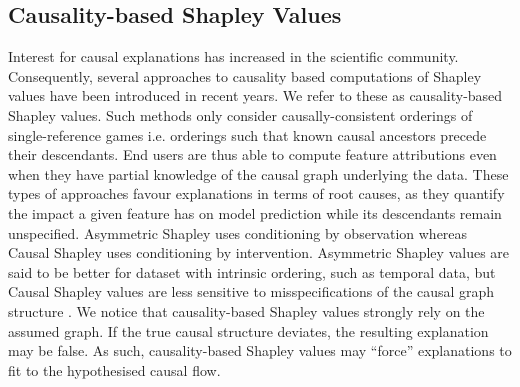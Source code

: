 \documentclass[nohyperref]{article}
\theoremstyle{plain}
\theoremstyle{definition}
\theoremstyle{remark}
\begin{document}
\subsection{Causality-based Shapley Values}
Interest for causal explanations has increased in the scientific community. Consequently, several approaches to causality based computations of Shapley values have been introduced in recent years. We refer to these as causality-based Shapley values. Such methods only consider causally-consistent orderings of single-reference games i.e. orderings such that known causal ancestors precede their descendants. End users are thus able to compute feature attributions even when they have partial knowledge of the causal graph underlying the data. These types of approaches favour explanations in terms of root causes, as they quantify the impact a given feature has on model prediction while its descendants remain unspecified. Asymmetric Shapley  \cite{frye2019asymmetric} uses conditioning by observation whereas Causal Shapley \cite{heskes2020causal} uses conditioning by intervention. Asymmetric Shapley values are said to be better for dataset with intrinsic ordering, such as temporal data, but Causal Shapley values are less sensitive to misspecifications of the causal graph structure \cite{heskes2020causal}. %
We notice that causality-based Shapley values strongly rely on the assumed graph. If the true causal structure deviates, the resulting explanation may be false. As such, causality-based Shapley values may ``force'' explanations to fit to the hypothesised causal flow. 


\end{document}
